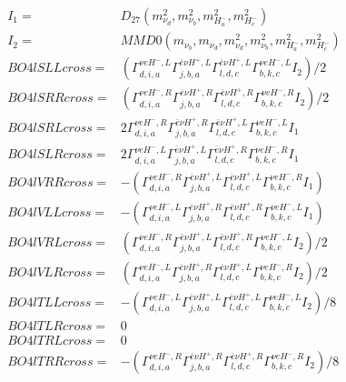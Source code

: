 \documentclass[A4,landscape]{article}
\begin{document}
\begin{align} 
I_1 = & D_{27}(m^2_{\nu_{{d}}}, m^2_{\nu_{{b}}}, m^2_{H^-_{{a}}}, m^2_{H^-_{{c}}}) \\ 
I_2 = & MMD0(m_{\nu_{{b}}}, m_{\nu_{{d}}}, m^2_{\nu_{{d}}}, m^2_{\nu_{{b}}}, m^2_{H^-_{{a}}}, m^2_{H^-_{{c}}}) \\ 
  BO4lSLLcross= & ( \Gamma^{\nu e H^- ,L}_{d, i, a} \Gamma^{\bar{e}\nu H^+,L}_{j, b, a} \Gamma^{\bar{e}\nu H^+,L}_{l, d, c} \Gamma^{\nu e H^- ,L}_{b, k, c} I_2)/2 \\ 
  BO4lSRRcross= & ( \Gamma^{\nu e H^- ,R}_{d, i, a} \Gamma^{\bar{e}\nu H^+,R}_{j, b, a} \Gamma^{\bar{e}\nu H^+,R}_{l, d, c} \Gamma^{\nu e H^- ,R}_{b, k, c} I_2)/2 \\ 
  BO4lSRLcross= & 2  \Gamma^{\nu e H^- ,R}_{d, i, a} \Gamma^{\bar{e}\nu H^+,R}_{j, b, a} \Gamma^{\bar{e}\nu H^+,L}_{l, d, c} \Gamma^{\nu e H^- ,L}_{b, k, c} I_1 \\ 
  BO4lSLRcross= & 2  \Gamma^{\nu e H^- ,L}_{d, i, a} \Gamma^{\bar{e}\nu H^+,L}_{j, b, a} \Gamma^{\bar{e}\nu H^+,R}_{l, d, c} \Gamma^{\nu e H^- ,R}_{b, k, c} I_1 \\ 
  BO4lVRRcross= & -( \Gamma^{\nu e H^- ,R}_{d, i, a} \Gamma^{\bar{e}\nu H^+,L}_{j, b, a} \Gamma^{\bar{e}\nu H^+,L}_{l, d, c} \Gamma^{\nu e H^- ,R}_{b, k, c} I_1) \\ 
  BO4lVLLcross= & -( \Gamma^{\nu e H^- ,L}_{d, i, a} \Gamma^{\bar{e}\nu H^+,R}_{j, b, a} \Gamma^{\bar{e}\nu H^+,R}_{l, d, c} \Gamma^{\nu e H^- ,L}_{b, k, c} I_1) \\ 
  BO4lVRLcross= & ( \Gamma^{\nu e H^- ,R}_{d, i, a} \Gamma^{\bar{e}\nu H^+,L}_{j, b, a} \Gamma^{\bar{e}\nu H^+,R}_{l, d, c} \Gamma^{\nu e H^- ,L}_{b, k, c} I_2)/2 \\ 
  BO4lVLRcross= & ( \Gamma^{\nu e H^- ,L}_{d, i, a} \Gamma^{\bar{e}\nu H^+,R}_{j, b, a} \Gamma^{\bar{e}\nu H^+,L}_{l, d, c} \Gamma^{\nu e H^- ,R}_{b, k, c} I_2)/2 \\ 
  BO4lTLLcross= & -( \Gamma^{\nu e H^- ,L}_{d, i, a} \Gamma^{\bar{e}\nu H^+,L}_{j, b, a} \Gamma^{\bar{e}\nu H^+,L}_{l, d, c} \Gamma^{\nu e H^- ,L}_{b, k, c} I_2)/8 \\ 
  BO4lTLRcross= & 0 \\ 
  BO4lTRLcross= & 0 \\ 
  BO4lTRRcross= & -( \Gamma^{\nu e H^- ,R}_{d, i, a} \Gamma^{\bar{e}\nu H^+,R}_{j, b, a} \Gamma^{\bar{e}\nu H^+,R}_{l, d, c} \Gamma^{\nu e H^- ,R}_{b, k, c} I_2)/8 \\ 
\end{align} 
\end{document}
